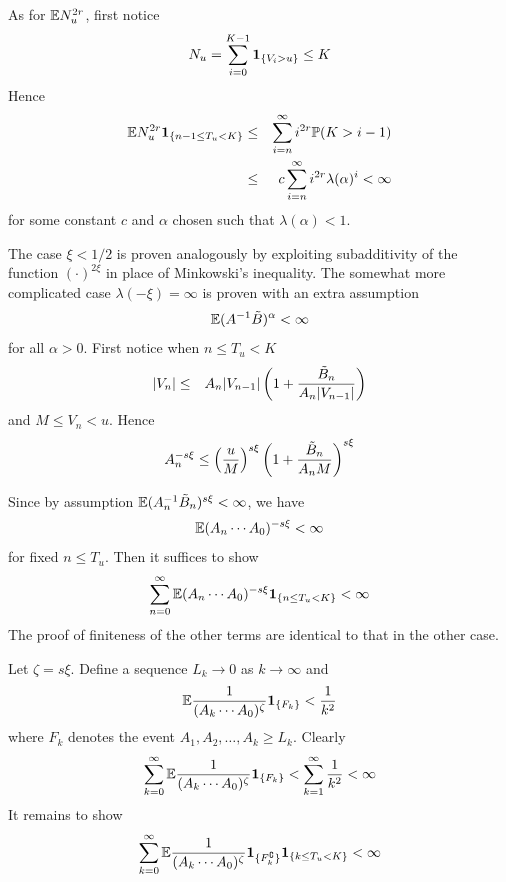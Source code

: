 \documentclass{beamer}
\begin{document}
\begin{frame}
  As for $\mathbb{E} N_u^{2r}$, first notice
  \[
  N_u = \sum_{i=0}^{K-1} \mathbf{1}_{\{V_i > u\}} \leq K
  \]
  Hence
  \begin{eqnarray*}
    \mathbb{E} N_u^{2r}\mathbf{1}_{\{n-1 \leq T_u < K\}} &\leq& \sum_{i=n}^\infty i^{2r}
    \mathbb{P}(K > i-1) \\
    &\leq& c \sum_{i=n}^\infty i^{2r} \lambda(\alpha)^i < \infty
  \end{eqnarray*}
  for some constant $c$ and $\alpha$ chosen such that $\lambda(\alpha)
  < 1$.
\end{frame}

\begin{frame}
  The case $\xi < 1/2$ is proven analogously by exploiting
  subadditivity of the function $(\cdot)^{2\xi}$ in place of
  Minkowski's inequality. The somewhat more complicated case
  $\lambda(-\xi) = \infty$ is proven with an extra assumption
  \[
  \mathbb{E} (A^{-1} \tilde B)^\alpha < \infty
  \]
  for all $\alpha > 0$. First notice when $n \leq T_u < K$
  \begin{eqnarray*}
    |V_n| &\leq& A_n |V_{n-1}| \left(
      1 + {
        \tilde B_n
        \over
        A_n |V_{n-1}|
      }
    \right)
  \end{eqnarray*}
  and $M \leq V_n < u$. Hence
  \[
  A_n^{-s\xi} \leq \left(
    {
      u \over M
    }
    \right)^{s\xi} 
    \left(
    1 + {
      \tilde B_n
      \over
      A_n M
    }
  \right)^{s\xi}
  \]
\end{frame}

\begin{frame}
  Since by assumption $\mathbb{E} (A_n^{-1} \tilde B_n)^{s\xi} < \infty$, we
  have
  \[
  \mathbb{E} (A_{n} \cdots A_0)^{-s\xi} < \infty
  \]
  for fixed $n \leq T_u$. Then it suffices to show
  \[
  \sum_{n=0}^\infty {
     \mathbb{E} (A_n \cdots A_0)^{-s\xi}  \mathbf{1}_{\{n \leq T_u < K\}} 
  } < \infty
  \]
  The proof of finiteness of the other terms are identical to that in
  the other case.
\end{frame}

\begin{frame}
  Let $\zeta = s \xi$. Define a sequence $L_k \to 0$ as $k \to \infty$
  and
  \[
  \mathbb{E} {
    1 \over
    (A_k \cdots A_0)^\zeta
  }  \mathbf{1}_{\{F_k\}} < {1 \over k^2}
  \]
  where $F_k$ denotes the event $A_1, A_2, \dots, A_{k} \geq
  L_k$. Clearly
  \[
  \sum_{k=0}^\infty  \mathbb{E} {
    1 \over
    (A_k \cdots A_0)^\zeta
  }  \mathbf{1}_{\{F_k\}} <  \sum_{k=1}^\infty {1 \over k^2} < \infty
  \]
  It remains to show
  \[
  \sum_{k=0}^\infty  \mathbb{E} {
    1 \over
    (A_k \cdots A_0)^\zeta
  }  \mathbf{1}_{\{F_k^\complement\}} \mathbf{1}_{\{k \leq T_u < K\}} < \infty
  \]
\end{frame}
\end{document}
